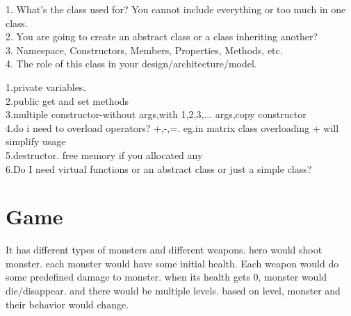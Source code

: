 1. What's the class used for? You cannot include everything or too much in one class. \\
2. You are going to create an abstract class or a class inheriting another? \\
3. Namespace, Constructors, Members, Properties, Methods, etc. \\
4. The role of this class in your design/architecture/model.

1.private variables. \\
2.public get and set methods  \\
3.multiple constructor-without args,with 1,2,3,... args,copy constructor \\
4.do i need to overload operators? +,-,=. eg.in matrix class overloading + will simplify usage \\
5.destructor. free memory if you allocated any \\
6.Do I need virtual functions or an abstract class or just a simple class?

\section{Game}
It has different types of monsters and different weapons. hero would shoot monster. each monster would have some initial health. Each weapon would do some predefined damage to
monster. when its health gets 0, monster would die/disappear. and there would be multiple levels. based on level, monster and their behavior would change.

